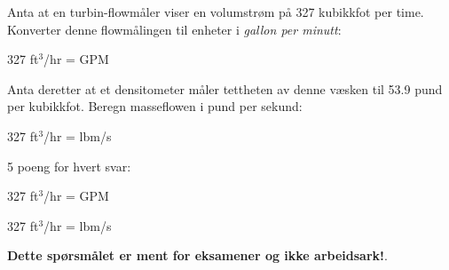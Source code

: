 

Anta at en turbin-flowmåler viser en volumstrøm på 327 kubikkfot per time. Konverter denne flowmålingen til enheter i {\it gallon per minutt}:

\vskip 10pt

327 ft$^{3}$/hr = \underbar{\hskip 50pt} GPM

\vskip 10pt

Anta deretter at et densitometer måler tettheten av denne væsken til 53.9 pund per kubikkfot. Beregn masseflowen i pund per sekund:

\vskip 10pt

327 ft$^{3}$/hr = \underbar{\hskip 50pt} lbm/s







5 poeng for hvert svar:

\vskip 10pt

327 ft$^{3}$/hr =  GPM

327 ft$^{3}$/hr =  lbm/s







{\bf Dette spørsmålet er ment for eksamener og ikke arbeidsark!}.


